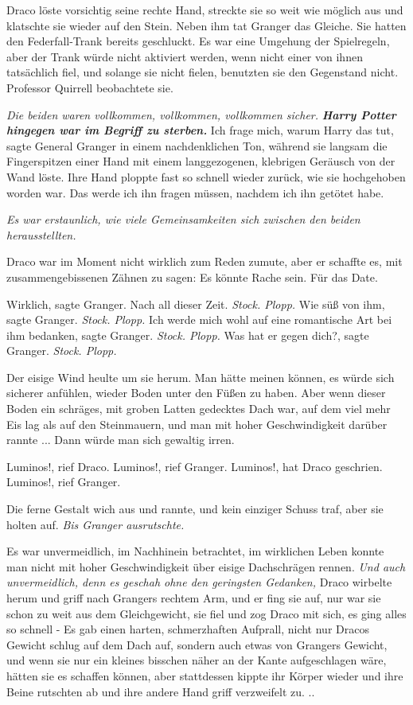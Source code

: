 Draco löste vorsichtig seine rechte Hand, streckte sie so weit wie möglich aus
und klatschte sie wieder auf den Stein. Neben ihm tat Granger das Gleiche. Sie
hatten den Federfall-Trank bereits geschluckt. Es war eine Umgehung der
Spielregeln, aber der Trank würde nicht aktiviert werden, wenn nicht einer von
ihnen tatsächlich fiel, und solange sie nicht fielen, benutzten sie den
Gegenstand nicht. Professor Quirrell beobachtete sie.

\emph{Die beiden waren vollkommen, vollkommen, vollkommen sicher.}
\textbf{\emph{Harry Potter hingegen war im Begriff zu sterben.}}\textbf{} \glqq{}
Ich frage mich, warum Harry das tut\grqq{}, sagte General Granger in einem
nachdenklichen Ton, während sie langsam die Fingerspitzen einer Hand mit einem
langgezogenen, klebrigen Geräusch von der Wand löste. Ihre Hand ploppte fast so
schnell wieder zurück, wie sie hochgehoben worden war. \glqq{}Das werde ich ihn
fragen müssen, nachdem ich ihn getötet habe.\grqq{}

\emph{Es war erstaunlich, wie viele Gemeinsamkeiten sich zwischen den beiden
herausstellten.}

Draco war im Moment nicht wirklich zum Reden zumute, aber er schaffte es, mit
zusammengebissenen Zähnen zu sagen: \glqq{}Es könnte Rache sein. Für das Date.\grqq{}

\glqq{}Wirklich\grqq{}, sagte Granger. \glqq{}Nach all dieser Zeit.\grqq{}
\emph{Stock. Plopp.}
\glqq{}Wie süß von ihm\grqq{}, sagte Granger.
\emph{Stock. Plopp.}
\glqq{}Ich werde mich wohl auf eine romantische Art bei ihm bedanken\grqq{},
sagte Granger.
\emph{Stock. Plopp.}
\glqq{}Was hat er gegen dich?\grqq{}, sagte Granger.
\emph{Stock. Plopp.}

Der eisige Wind heulte um sie herum. Man hätte meinen können, es würde sich
sicherer anfühlen, wieder Boden unter den Füßen zu haben. Aber wenn dieser Boden
ein schräges, mit groben Latten gedecktes Dach war, auf dem viel mehr Eis lag
als auf den Steinmauern, und man mit hoher Geschwindigkeit darüber rannte ...
Dann würde man sich gewaltig irren.

\glqq{}Luminos!\grqq{}, rief Draco. \glqq{}Luminos!\grqq{}, rief Granger. \glqq{}
Luminos!\grqq{}, hat Draco geschrien. \glqq{}Luminos!\grqq{}, rief Granger.

Die ferne Gestalt wich aus und rannte, und kein einziger Schuss traf, aber sie
holten auf. \emph{ Bis Granger ausrutschte.}

Es war unvermeidlich, im Nachhinein betrachtet, im wirklichen Leben konnte man
nicht mit hoher Geschwindigkeit über eisige Dachschrägen rennen.
\emph{Und auch unvermeidlich, denn es geschah ohne den geringsten Gedanken,}
Draco wirbelte herum und griff nach Grangers rechtem Arm, und er fing sie auf,
nur war sie schon zu weit aus dem Gleichgewicht, sie fiel und zog Draco mit
sich, es ging alles so schnell - Es gab einen harten, schmerzhaften Aufprall,
nicht nur Dracos Gewicht schlug auf dem Dach auf, sondern auch etwas von
Grangers Gewicht, und wenn sie nur ein kleines bisschen näher an der Kante
aufgeschlagen wäre, hätten sie es schaffen können, aber stattdessen kippte ihr
Körper wieder und ihre Beine rutschten ab und ihre andere Hand griff verzweifelt
zu. ..

